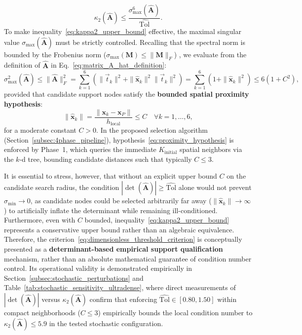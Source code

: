 \documentclass[preprint,12pt]{elsarticle}
\begin{document}
\begin{equation}
    \kappa_2(\widehat{\mathbf{A}}) \le \frac{\sigma_{\max}^6(\widehat{\mathbf{A}})}{\widehat{\mathrm{Tol}}}.
    \label{eq:kappa2_upper_bound}
\end{equation}
To make inequality~\eqref{eq:kappa2_upper_bound} effective, the maximal singular value $\sigma_{\max}(\widehat{\mathbf{A}})$ must be strictly controlled. Recalling that the spectral norm is bounded by the Frobenius norm ($\sigma_{\max}(\mathbf{M}) \le \|\mathbf{M}\|_F$) \cite{golub2013matrix}, we evaluate from the definition of $\widehat{\mathbf{A}}$ in Eq.~\eqref{eq:matrix_A_hat_definition}:
\begin{equation}
    \sigma_{\max}^2(\widehat{\mathbf{A}}) \le \|\widehat{\mathbf{A}}\|_F^2 = \sum_{k=1}^6 \left( \|\vec{t}_k\|^2 + \|\hat{\mathbf{x}}_k\|^2 \|\vec{t}_k\|^2 \right) = \sum_{k=1}^6 \left( 1 + \|\hat{\mathbf{x}}_k\|^2 \right) \le 6(1 + C^2),
    \label{eq:frobenius_bound}
\end{equation}
provided that candidate support nodes satisfy the \textbf{bounded spatial proximity hypothesis}:
\begin{equation}
    \|\hat{\mathbf{x}}_k\| = \frac{\|\mathbf{x}_k - \mathbf{x}_P\|}{h_{\mathrm{local}}} \le C \quad \forall k=1,\dots,6,
    \label{eq:proximity_hypothesis}
\end{equation}
for a moderate constant $C > 0$. In the proposed selection algorithm (Section~\ref{subsec:4phase_pipeline}), hypothesis~\eqref{eq:proximity_hypothesis} is enforced by Phase~1, which queries the immediate $K_{\mathrm{initial}}$ spatial neighbors via the $k$-d tree, bounding candidate distances such that typically $C \le 3$.

It is essential to stress, however, that without an explicit upper bound $C$ on the candidate search radius, the condition $|\det(\widehat{\mathbf{A}})| \ge \widehat{\mathrm{Tol}}$ alone would not prevent $\sigma_{\min} \to 0$, as candidate nodes could be selected arbitrarily far away ($\|\hat{\mathbf{x}}_k\| \to \infty$) to artificially inflate the determinant while remaining ill-conditioned. Furthermore, even with $C$ bounded, inequality~\eqref{eq:kappa2_upper_bound} represents a conservative upper bound rather than an algebraic equivalence. Therefore, the criterion~\eqref{eq:dimensionless_threshold_criterion} is conceptually presented as a \textbf{determinant-based empirical support qualification} mechanism, rather than an absolute mathematical guarantee of condition number control. Its operational validity is demonstrated empirically in Section~\ref{subsec:stochastic_perturbations} and Table~\ref{tab:stochastic_sensitivity_ultradense}, where direct measurements of $|\det(\widehat{\mathbf{A}})|$ versus $\kappa_2(\widehat{\mathbf{A}})$ confirm that enforcing $\widehat{\mathrm{Tol}} \in [0.80, 1.50]$ within compact neighborhoods ($C \le 3$) empirically bounds the local condition number to $\kappa_2(\widehat{\mathbf{A}}) \le 5.9$ in the tested stochastic configuration.
\end{document}
